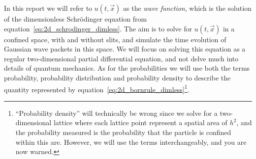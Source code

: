     In this report we will refer to $u(t, \vec{x})$ as the \textit{wave function}, which is the solution of the dimensionless Schrödinger equation from equation~\eqref{eq:2d_schrodinger_dimless}. The aim is to solve for $u(t,\vec{x})$ in a confined space, with and without slits, and simulate the time evolution of Gaussian wave packets in this space. We will focus on solving this equation as a regular two-dimensional partial differential equation, and not delve much into details of quantum mechanics. As for the probabilities we will use both the terms probability,  probability distribution and probability density to describe the quantity represented by equation~\eqref{eq:2d_bornrule_dimless}\footnote{``Probability density'' will technically be wrong since we solve for a two-dimensional lattice where each lattice point represent a spatial area of $h^2$, and the probability measured is the probability that the particle is confined within this are. However, we will use the terms interchangeably, and you are now warned.}.